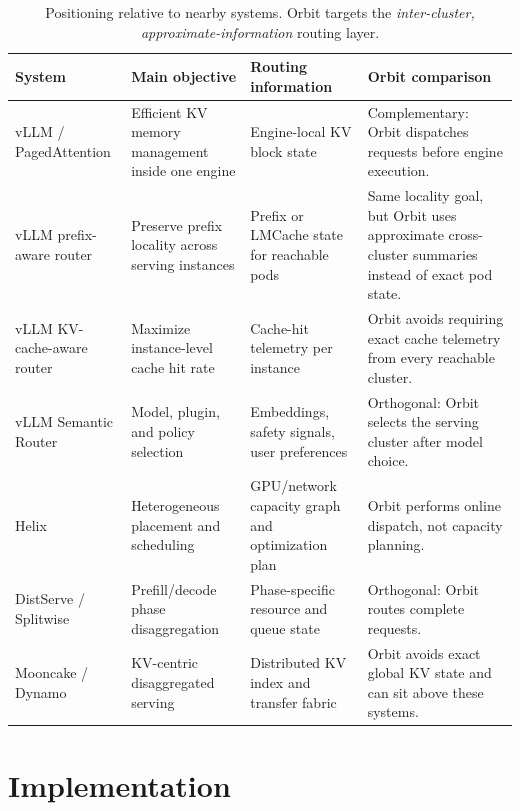 \documentclass[10pt,twocolumn]{article}
\newcommand{\sys}{Orbit}
\begin{document}
\begin{table}[t]
\centering
\caption{Positioning relative to nearby systems. \sys{} targets the
\emph{inter-cluster, approximate-information} routing layer.}
\label{tab:related-positioning}
\footnotesize
\setlength{\tabcolsep}{3.5pt}
\renewcommand{\arraystretch}{1.12}
\begin{tabular}{@{}>{\raggedright\arraybackslash}p{}
                >{\raggedright\arraybackslash}p{}
                >{\raggedright\arraybackslash}p{}
                >{\raggedright\arraybackslash}p{}@{}}
\toprule
\textbf{System} & \textbf{Main objective} & \textbf{Routing information} & \textbf{\sys{} comparison} \\
\midrule
vLLM / PagedAttention & Efficient KV memory management inside one engine & Engine-local KV block state & Complementary: \sys{} dispatches requests before engine execution. \\
vLLM prefix-aware router & Preserve prefix locality across serving instances & Prefix or LMCache state for reachable pods & Same locality goal, but \sys{} uses approximate cross-cluster summaries instead of exact pod state. \\
vLLM KV-cache-aware router & Maximize instance-level cache hit rate & Cache-hit telemetry per instance & \sys{} avoids requiring exact cache telemetry from every reachable cluster. \\
vLLM Semantic Router & Model, plugin, and policy selection & Embeddings, safety signals, user preferences & Orthogonal: \sys{} selects the serving cluster after model choice. \\
Helix & Heterogeneous placement and scheduling & GPU/network capacity graph and optimization plan & \sys{} performs online dispatch, not capacity planning. \\
DistServe / Splitwise & Prefill/decode phase disaggregation & Phase-specific resource and queue state & Orthogonal: \sys{} routes complete requests. \\
Mooncake / Dynamo & KV-centric disaggregated serving & Distributed KV index and transfer fabric & \sys{} avoids exact global KV state and can sit above these systems. \\
\bottomrule
\end{tabular}
\end{table}

\section{Implementation}
\end{document}
